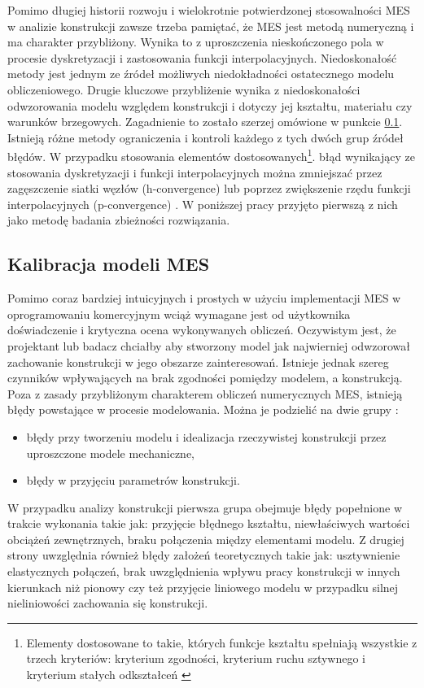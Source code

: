 Pomimo długiej historii rozwoju i wielokrotnie potwierdzonej stosowalności MES w analizie konstrukcji zawsze trzeba pamiętać, że MES jest metodą numeryczną i ma charakter przybliżony. Wynika to z uproszczenia nieskończonego pola w procesie dyskretyzacji  i zastosowania funkcji interpolacyjnych. Niedoskonałość metody jest jednym ze źródeł możliwych niedokładności ostatecznego modelu obliczeniowego. Drugie kluczowe przybliżenie wynika z niedoskonałości odwzorowania modelu względem konstrukcji i dotyczy jej kształtu, materiału czy warunków brzegowych. Zagadnienie to zostało szerzej omówione w punkcie \ref{sect:calibration_model}. Istnieją różne metody ograniczenia i kontroli każdego z tych dwóch grup źródeł błędów. W przypadku stosowania elementów dostosowanych\footnote{Elementy dostosowane to takie, których funkcje kształtu spełniają wszystkie z trzech kryteriów: kryterium zgodności, kryterium ruchu sztywnego i kryterium stałych odkształceń \parencite{Rakowski2016}}.
błąd wynikający ze stosowania dyskretyzacji i funkcji interpolacyjnych można zmniejszać przez zagęszczenie siatki węzłów (h-convergence) lub poprzez zwiększenie rzędu funkcji interpolacyjnych (p-convergence) \parencite{Zienkiewicz2005}. W poniższej pracy przyjęto pierwszą z nich jako metodę badania zbieżności rozwiązania.

\subsection{Kalibracja modeli MES} \label{sect:calibration_model}
Pomimo coraz bardziej intuicyjnych i prostych w użyciu implementacji MES w oprogramowaniu komercyjnym wciąż wymagane jest od użytkownika doświadczenie i krytyczna ocena wykonywanych obliczeń. Oczywistym jest, że projektant lub badacz chciałby aby stworzony model jak najwierniej odwzorował zachowanie konstrukcji w jego obszarze zainteresowań. Istnieje jednak szereg czynników wpływających na brak zgodności pomiędzy modelem, a konstrukcją. Poza z zasady przybliżonym charakterem obliczeń numerycznych MES, istnieją błędy powstające w procesie modelowania. Można je podzielić na dwie grupy \parencite{Mottershead1993,Mottershead2011}:
\begin{itemize}
	\item błędy przy tworzeniu modelu i idealizacja rzeczywistej konstrukcji przez uproszczone modele mechaniczne,
	\item błędy w przyjęciu parametrów konstrukcji.
\end{itemize}

W przypadku analizy konstrukcji pierwsza grupa obejmuje błędy popełnione w trakcie wykonania takie jak: przyjęcie błędnego kształtu, niewłaściwych wartości obciążeń zewnętrznych, braku połączenia między elementami modelu. Z drugiej strony uwzględnia również błędy założeń teoretycznych takie jak: usztywnienie elastycznych połączeń, brak uwzględnienia wpływu pracy konstrukcji w innych kierunkach niż pionowy czy też przyjęcie liniowego modelu w przypadku silnej nieliniowości zachowania się konstrukcji. 

